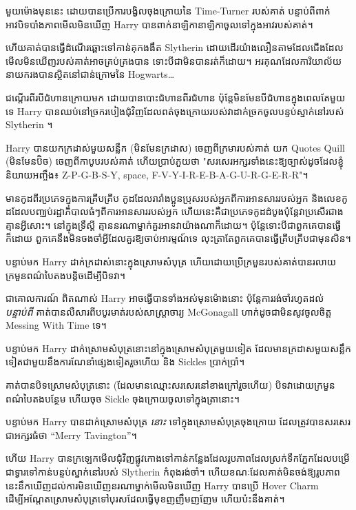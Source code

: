 \later

មួយម៉ោងមុននេះ ដោយបានប្រើការបង្វិលចុងក្រោយនៃ Time-Turner របស់គាត់ បន្ទាប់ពីពាក់អាវបិទបាំងភាពមើលមិនឃើញ Harry បានពាក់នាឡិកានាឡិកាចូលទៅក្នុងអាវរបស់គាត់។

ហើយគាត់បានធ្វើដំណើរឆ្ពោះទៅកាន់គុកងងឹត Slytherin ដោយដើរយ៉ាងលឿនតាមដែលជើងដែលមើលមិនឃើញរបស់គាត់អាចគ្រប់គ្រងបាន ទោះបីជាមិនបានរត់ក៏ដោយ។ អរគុណដែលការិយាល័យនាយករងបានស្ថិតនៅជាន់ក្រោមនៃ Hogwarts…

ជណ្តើរពីរបីជំហានក្រោយមក ដោយបានបោះជំហានពីរជំហាន ប៉ុន្តែមិនមែនបីជំហានក្នុងពេលតែមួយទេ Harry បានឈប់នៅច្រករបៀងជុំវិញដែលពត់ចុងក្រោយរបស់វាដាក់ច្រកចូលបន្ទប់ស្នាក់នៅរបស់ Slytherin ។

Harry បានយកក្រដាស់មួយសន្លឹក (មិនមែនក្រដាស) ចេញពីក្រមារបស់គាត់ យក Quotes Quill (មិនមែនប៊ិច) ចេញពីកាបូបរបស់គាត់ ហើយប្រាប់ភួយថា "សរសេរអក្សរទាំងនេះឱ្យច្បាស់ដូចដែលខ្ញុំនិយាយអញ្ចឹង៖ Z-P-G-B-S-Y, space, F-V-Y-I-R-E-B-A-G-U-R-G-E-R-R"។

មានកូដពីរប្រភេទក្នុងការគ្រីបគ្រីប កូដដែលរារាំងប្អូនប្រុសរបស់អ្នកពីការអានសាររបស់អ្នក និងលេខកូដដែលបញ្ឈប់រដ្ឋាភិបាលធំៗពីការអានសាររបស់អ្នក ហើយនេះគឺជាប្រភេទកូដដំបូងប៉ុន្តែវាប្រសើរជាងគ្មានអ្វីសោះ។ នៅក្នុងទ្រឹស្តី គ្មាននរណាម្នាក់គួរអានវាយ៉ាងណាក៏ដោយ។ ប៉ុន្តែទោះបីជាពួកគេបានធ្វើក៏ដោយ ពួកគេនឹងមិនចងចាំអ្វីដែលគួរឱ្យចាប់អារម្មណ៍ទេ លុះត្រាតែពួកគេបានធ្វើគ្រីបគ្រីបជាមុនសិន។

បន្ទាប់មក Harry ដាក់​ក្រដាស់​នោះ​ក្នុង​ស្រោម​សំបុត្រ ហើយ​ដោយ​ប្រើ​ក្រមួន​របស់​គាត់​បាន​រលាយ​ក្រមួន​ពណ៌​បៃតង​បន្តិច​ដើម្បី​បិទ​វា។

ជាគោលការណ៍ ពិតណាស់ Harry អាចធ្វើបានទាំងអស់មុនម៉ោងនោះ ប៉ុន្តែការរង់ចាំរហូតដល់ \emph{បន្ទាប់ពី} គាត់បានលឺសារពីបបូរមាត់របស់សាស្រ្តាចារ្យ McGonagall ហាក់ដូចជាមិនសូវចូលចិត្ត Messing With Time ទេ។

បន្ទាប់​មក Harry ដាក់​ស្រោម​សំបុត្រ​នោះ​នៅ​ក្នុង​ស្រោម​សំបុត្រ​មួយ​ទៀត ដែល​មាន​ក្រដាស​មួយ​សន្លឹក​ទៀត​ជាមួយ​នឹង​ការ​ណែនាំ​ផ្សេង​ទៀត​រួច​ហើយ និង​ Sickles ប្រាក់​ប្រាំ។

គាត់​បាន​បិទ​ស្រោម​សំបុត្រ​នោះ (ដែល​មាន​ឈ្មោះ​សរសេរ​នៅ​ខាង​ក្រៅ​រួច​ហើយ) បិទ​វា​ដោយ​ក្រមួន​ពណ៌​បៃតង​បន្ថែម ហើយ​ចុច Sickle ចុងក្រោយ​ចូលទៅក្នុង​ត្រានោះ។

បន្ទាប់មក Harry បានដាក់ស្រោមសំបុត្រ \emph{នោះ} ទៅក្នុងស្រោមសំបុត្រចុងក្រោយ ដែលត្រូវបានសរសេរជាអក្សរធំថា “Merry Tavington”។

ហើយ Harry បានក្រឡេកមើលជុំវិញផ្លូវកោងទៅកាន់កន្លែងដែលរូបភាពដែលស្រក់ទឹកភ្នែកដែលបម្រើជាទ្វារទៅកាន់បន្ទប់ស្នាក់នៅរបស់ Slytherin កំពុងរង់ចាំ។ ហើយខណៈដែលគាត់មិនចង់ឱ្យរូបភាពនេះនឹកឃើញដល់ការមិនឃើញនរណាម្នាក់មើលមិនឃើញ Harry បានប្រើ Hover Charm ដើម្បីអណ្តែតស្រោមសំបុត្រទៅបុរសដែលធ្វើមុខញញឹមញញែម ហើយប៉ះនឹងគាត់។

